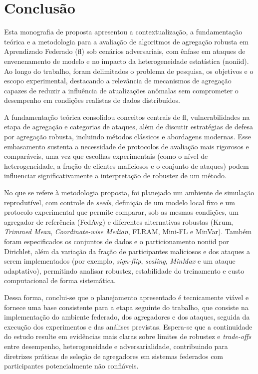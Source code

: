 \chapter{Conclusão}
\label{chap:conclusão}

Esta monografia de proposta apresentou a contextualização, a fundamentação teórica e a metodologia para a avaliação de algoritmos de agregação robusta em Aprendizado Federado (\gls{fl}) sob cenários adversariais, com ênfase em ataques de envenenamento de modelo e no impacto da heterogeneidade estatística (\gls{noniid}). Ao longo do trabalho, foram delimitados o problema de pesquisa, os objetivos e o escopo experimental, destacando a relevância de mecanismos de agregação capazes de reduzir a influência de atualizações anômalas sem comprometer o desempenho em condições realistas de dados distribuídos. 

A fundamentação teórica consolidou conceitos centrais de \gls{fl}, vulnerabilidades na etapa de agregação e categorias de ataques, além de discutir estratégias de defesa por agregação robusta, incluindo métodos clássicos e abordagens modernas. Esse embasamento sustenta a necessidade de protocolos de avaliação mais rigorosos e comparáveis, uma vez que escolhas experimentais (como o nível de heterogeneidade, a fração de clientes maliciosos e o conjunto de ataques) podem influenciar significativamente a interpretação de robustez de um método.

No que se refere à metodologia proposta, foi planejado um ambiente de simulação reprodutível, com controle de \textit{seeds}, definição de um modelo local fixo e um protocolo experimental que permite comparar, sob as mesmas condições, um agregador de referência (FedAvg) e diferentes alternativas robustas (Krum, \textit{Trimmed Mean}, \textit{Coordinate-wise Median}, FLRAM, Mini-FL e MinVar). Também foram especificados os conjuntos de dados e o particionamento \gls{noniid} por Dirichlet, além da variação da fração de participantes maliciosos e dos ataques a serem implementados (por exemplo, \textit{sign-flip}, \textit{scaling}, \textit{MinMax} e um ataque adaptativo), permitindo analisar robustez, estabilidade do treinamento e custo computacional de forma sistemática.

Dessa forma, conclui-se que o planejamento apresentado é tecnicamente viável e fornece uma base consistente para a etapa seguinte do trabalho, que consiste na implementação do ambiente federado, dos agregadores e dos ataques, seguida da execução dos experimentos e das análises previstas. Espera-se que a continuidade do estudo resulte em evidências mais claras sobre limites de robustez e \textit{trade-offs} entre desempenho, heterogeneidade e adversarialidade, contribuindo para diretrizes práticas de seleção de agregadores em sistemas federados com participantes potencialmente não confiáveis.
